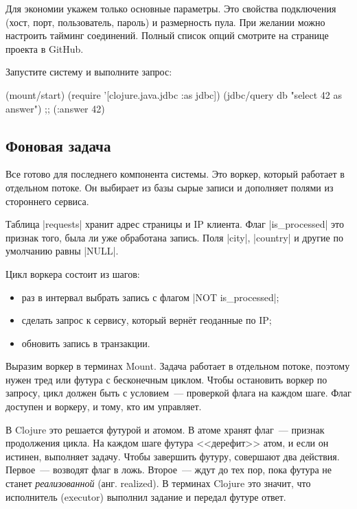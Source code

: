 Для экономии укажем только основные параметры. Это свойства подключения (хост,
порт, пользователь, пароль) и размерность пула. При желании можно настроить
тайминг соединений. Полный список опций смотрите на странице проекта в GitHub.

Запустите систему и выполните запрос:

\begin{english}
  \begin{clojure}
(mount/start)
(require '[clojure.java.jdbc :as jdbc])
(jdbc/query db "select 42 as answer")
;; ({:answer 42})
  \end{clojure}
\end{english}

\subsection{Фоновая задача}

\label{worker}

Все готово для последнего компонента системы. Это воркер, который работает в
отдельном потоке. Он выбирает из базы сырые записи и дополняет полями из
стороннего сервиса.

Таблица \spverb|requests| хранит адрес страницы и IP клиента. Флаг
\spverb|is_processed| это признак того, была ли уже обработана запись. Поля
\spverb|city|, \spverb|country| и другие по умолчанию равны \spverb|NULL|.

Цикл воркера состоит из шагов:

\begin{itemize}

\item
  раз в интервал выбрать запись с флагом \spverb|NOT is_processed|;

\item
  сделать запрос к сервису, который верн\"{е}т геоданные по IP;

\item
  обновить запись в транзакции.

\end{itemize}

Выразим воркер в терминах Mount. Задача работает в отдельном потоке, поэтому
нужен тред или футура с бесконечным циклом. Чтобы остановить воркер по запросу,
цикл должен быть с условием~--- проверкой флага на каждом шаге. Флаг доступен и
воркеру, и тому, кто им управляет.

В Clojure это решается футурой и атомом. В атоме хранят флаг~--- признак
продолжения цикла. На каждом шаге футура <<дерефит>> атом, и если он истинен,
выполняет задачу. Чтобы завершить футуру, совершают два действия. Первое~---
возводят флаг в ложь. Второе~--- ждут до тех пор, пока футура не станет
\emph{реализованной} (анг. realized). В терминах Clojure это значит, что
исполнитель (executor) выполнил задание и передал футуре ответ.

